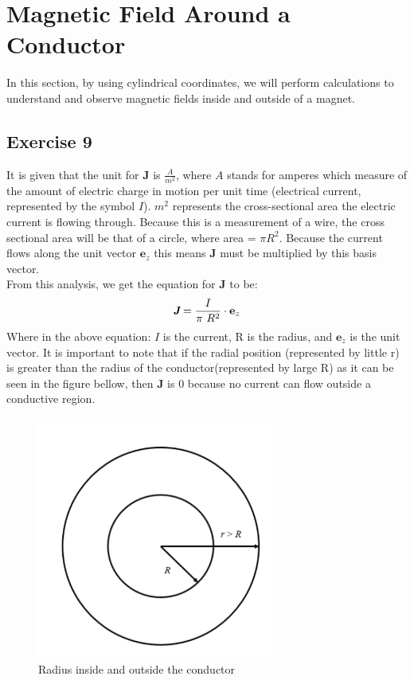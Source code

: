 \documentclass{article}
\begin{document}
\section{Magnetic Field Around a Conductor}
In this section, by using cylindrical coordinates, we will perform calculations to understand and observe magnetic fields inside and outside of a magnet. 
\subsection{Exercise 9}
It is given that the unit for $\mathbf{J}$ is $\frac{A}{m^2}$, where $A$ stands for amperes which  measure of the amount of electric charge in motion per unit time (electrical current, represented by the symbol $I$). $m^2$ represents the cross-sectional area the electric current is flowing through. Because this is a measurement of a wire, the cross sectional area will be that of a circle, where area = $\pi  R^2$. Because the current flows along the unit vector $\mathbf{e}_z$ this means $\mathbf{J}$ must be multiplied by this basis vector.
\\
From this analysis, we get the equation for $\mathbf{J}$ to be:
\begin{equation}
    \emph{\textbf{J}}=\frac{I}{\pi\ R^{2}}\cdot \mathbf{e}_{z}
\end{equation}
Where in the above equation: $I$ is the current, R is the radius, and $\mathbf{e}_{z}$ is the unit vector. It is important to note that if the radial position (represented by little r) is greater than the radius of the conductor(represented by large R) as it can be seen in the figure bellow, then $\mathbf{J}$ is 0 because no current can flow outside a conductive region. 
\begin{figure}[h!]
\includegraphics[width=8cm]{radius.PNG}
\centering
\caption{Radius inside and outside the conductor}
\end{figure}
\newpage
\end{document}
